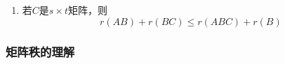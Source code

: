 \documentclass[./linear_algebra.tex]{subfiles}
\begin{document}
\begin{enumerate}
\begin{itemize}
\begin{circlenum}
\[                    \begin{bmatrix}
                        \beta_1 \\ \beta_2 \\ \vdots \\ \beta_n
                    \end{bmatrix}
                    =
                    \begin{bmatrix}
                        \alpha_1 \\ \alpha_2 \\ \vdots \\ \alpha_n
                    \end{bmatrix}
                \]
                即
                \[
                    \begin{cases}
                        a_{11}\beta_1 + \dots + a_{1n}\beta_n &= \alpha_1, \\
                        a_{21}\beta_1 + \dots + a_{2n}\beta_n &= \alpha_2, \\
                        \vdots & \\
                        a_{n1}\beta_1 + \dots + a_{nn}\beta_n &= \alpha_n
                    \end{cases}
                \]
            \end{circlenum}
            \item {\color[rgb]{0.2, 0.6, 0.3}{矩阵$C(AB)$的列向量可由$A$的列向量线性表出}}
        \end{itemize}
        \item 若$C$是$s \times t$矩阵，则
        \[
            r(AB) + r(BC) \leq r(ABC) + r(B)
        \]
    \end{enumerate}

    \subsubsection{矩阵秩的理解}
\end{document}
